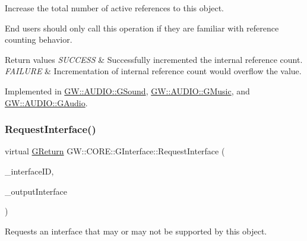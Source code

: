 Increase the total number of active references to this object. 

End users should only call this operation if they are familiar with reference counting behavior.


\begin{DoxyRetVals}{Return values}
{\em S\+U\+C\+C\+E\+SS} & Successfully incremented the internal reference count. \\
\hline
{\em F\+A\+I\+L\+U\+RE} & Incrementation of internal reference count would overflow the value. \\
\hline
\end{DoxyRetVals}


Implemented in \mbox{\hyperlink{class_g_w_1_1_a_u_d_i_o_1_1_g_sound_a33149257f0958b4db57f5508492410ad}{G\+W\+::\+A\+U\+D\+I\+O\+::\+G\+Sound}}, \mbox{\hyperlink{class_g_w_1_1_a_u_d_i_o_1_1_g_music_a22d7a170b4d307e5398ebb92f950431f}{G\+W\+::\+A\+U\+D\+I\+O\+::\+G\+Music}}, and \mbox{\hyperlink{class_g_w_1_1_a_u_d_i_o_1_1_g_audio_aba5697a3a308026ecaa12737d6fe6705}{G\+W\+::\+A\+U\+D\+I\+O\+::\+G\+Audio}}.

\mbox{\label{class_g_w_1_1_c_o_r_e_1_1_g_interface_ad6c8324970172784964f484686d4fdad}} 
\subsubsection{\texorpdfstring{Request\+Interface()}{RequestInterface()}}
{\footnotesize\ttfamily virtual \mbox{\hyperlink{namespace_g_w_a67a839e3df7ea8a5c5686613a7a3de21}{G\+Return}} G\+W\+::\+C\+O\+R\+E\+::\+G\+Interface\+::\+Request\+Interface (\begin{DoxyParamCaption}\item[{const \mbox{\hyperlink{struct_g_w_1_1_g_u_u_i_i_d}{G\+U\+U\+I\+ID}} \&}]{\+\_\+interface\+ID,  }\item[{void $\ast$$\ast$}]{\+\_\+output\+Interface }\end{DoxyParamCaption})\hspace{0.3cm}{\ttfamily [pure virtual]}}



Requests an interface that may or may not be supported by this object. 

